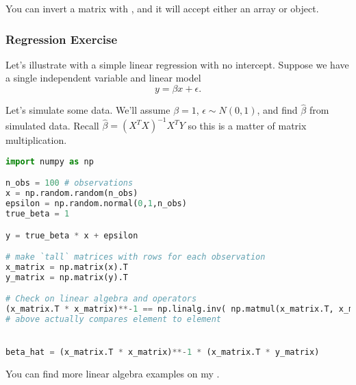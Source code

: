 You can invert a matrix with , and it will accept either an array or  object.



\subsubsection{Regression Exercise}
\noindent Let's illustrate with a simple linear regression with no intercept. Suppose we have a single independent variable and linear model
$$ y = \beta x + \epsilon .$$

\noindent Let's simulate some data. We'll assume $\beta = 1$, $\epsilon \sim N(0,1)$, and find $\hat{\beta}$ from simulated data. Recall $\hat{\beta} = (X^T X)^{-1} X^T Y$ so this is a matter of matrix multiplication.

\begin{lstlisting}[language = Python]
import numpy as np

n_obs = 100 # observations
x = np.random.random(n_obs)
epsilon = np.random.normal(0,1,n_obs)
true_beta = 1

y = true_beta * x + epsilon

# make `tall` matrices with rows for each observation
x_matrix = np.matrix(x).T
y_matrix = np.matrix(y).T 

# Check on linear algebra and operators
(x_matrix.T * x_matrix)**-1 == np.linalg.inv( np.matmul(x_matrix.T, x_matrix) )
# above actually compares element to element


beta_hat = (x_matrix.T * x_matrix)**-1 * (x_matrix.T * y_matrix)
\end{lstlisting}

You can find more linear algebra examples on my .

\